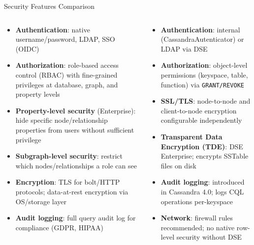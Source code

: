 \documentclass[aspectratio=169]{beamer}
\begin{document}
\begin{frame}{Security Features Comparison}
  \begin{columns}[T]
      \begin{tcolorbox}[neo4jbox, title=Neo4j Security]
        \small
        \begin{itemize}
          \item \textbf{Authentication}: native username/password, LDAP, SSO (OIDC)
          \item \textbf{Authorization}: role-based access control (RBAC) with fine-grained privileges at database, graph, and property levels
          \item \textbf{Property-level security} (Enterprise): hide specific node/relationship properties from users without sufficient privilege
          \item \textbf{Subgraph-level security}: restrict which nodes/relationships a role can see
          \item \textbf{Encryption}: TLS for bolt/HTTP protocols; data-at-rest encryption via OS/storage layer
          \item \textbf{Audit logging}: full query audit log for compliance (GDPR, HIPAA)
        \end{itemize}
      \end{tcolorbox}
      \begin{tcolorbox}[cassbox, title=Cassandra Security]
        \small
        \begin{itemize}
          \item \textbf{Authentication}: internal (CassandraAutenticator) or LDAP via DSE
          \item \textbf{Authorization}: object-level permissions (keyspace, table, function) via \texttt{GRANT/REVOKE}
          \item \textbf{SSL/TLS}: node-to-node and client-to-node encryption configurable independently
          \item \textbf{Transparent Data Encryption (TDE)}: DSE Enterprise; encrypts SSTable files on disk
          \item \textbf{Audit logging}: introduced in Cassandra 4.0; logs CQL operations per-keyspace
          \item \textbf{Network}: firewall rules recommended; no native row-level security without DSE
        \end{itemize}
      \end{tcolorbox}
  \end{columns}
\end{frame}
\end{document}
